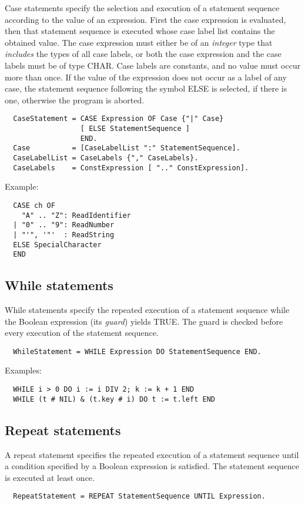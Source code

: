 Case statements specify the selection and execution of a statement
sequence according to the value of an expression. First the case expression
is evaluated, then that statement sequence is executed whose case
label list contains the obtained value. The case expression must either
be of an {\em integer} type that {\em includes} the types of all case labels,
or both the case expression and the case labels must be of type CHAR.
Case labels are constants, and no value must occur more than once.
If the value of the expression does not occur as a label of any case,
the statement sequence following the symbol ELSE is selected, if there
is one, otherwise the program is aborted.
{\BNFsize
\begin{verbatim}
  CaseStatement = CASE Expression OF Case {"|" Case}
                  [ ELSE StatementSequence ]
                  END.
  Case          = [CaseLabelList ":" StatementSequence].
  CaseLabelList = CaseLabels {"," CaseLabels}.
  CaseLabels    = ConstExpression [ ".." ConstExpression].
\end{verbatim}}

\noindent
Example:
\begin{verbatim}
  CASE ch OF
    "A" .. "Z": ReadIdentifier
  | "0" .. "9": ReadNumber
  | "'", '"'  : ReadString
  ELSE SpecialCharacter
  END
\end{verbatim}

\subsection{While statements}

While statements specify the repeated execution of a statement sequence
while the Boolean expression (its {\em guard}) yields TRUE. The guard
is checked before every execution of the statement sequence.
{\BNFsize
\begin{verbatim}
  WhileStatement = WHILE Expression DO StatementSequence END.
\end{verbatim}}

\noindent
Examples:
\begin{verbatim}
  WHILE i > 0 DO i := i DIV 2; k := k + 1 END
  WHILE (t # NIL) & (t.key # i) DO t := t.left END
\end{verbatim}

\subsection{Repeat statements}

A repeat statement specifies the repeated execution of a statement
sequence until a condition specified by a Boolean expression is satisfied.
The statement sequence is executed at least once.
{\BNFsize
\begin{verbatim}
  RepeatStatement = REPEAT StatementSequence UNTIL Expression.
\end{verbatim}}

